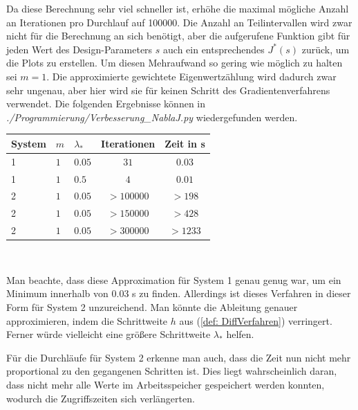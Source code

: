 \documentclass[a4paper,12pt]{report}
\newcommand{\1}{\mathds{1}}
\theoremstyle{plain} %
\theoremstyle{definition} %
\theoremstyle{remark}
\begin{document}
            Da diese Berechnung sehr viel schneller ist, erhöhe die maximal mögliche Anzahl an Iterationen pro Durchlauf auf 100000.
            Die Anzahl an Teilintervallen wird zwar nicht für die Berechnung an sich benötigt, aber die aufgerufene Funktion gibt für jeden Wert des Design-Parameters $s$
            auch ein entsprechendes $J^*(s)$ zurück, um die Plots zu erstellen.
            Um diesen Mehraufwand so gering wie möglich zu halten sei $m=1$. Die approximierte gewichtete Eigenwertzählung wird dadurch zwar sehr ungenau,
            aber hier wird sie für keinen Schritt des Gradientenverfahrens verwendet.
            Die folgenden Ergebnisse können in \textit{./Programmierung/Verbesserung\_NablaJ.py} wiedergefunden werden.

            \begin{table}[!ht]
                  \centering
                  \begin{tabular}{lllcc}
                       System & $m$ & $\lambda_*$ & Iterationen & Zeit in s\\
                       \hline
                       1 & $1$ & $0.05$ & $31$ & $0.03$ \\ 
                       \hline
                       1 & $1$ & $0.5$ & $4$ & $0.01$ \\
                       \hline
                       2 & $1$ & $0.05$ & $>100000$ & $>198$ \\
                       2 & $1$ & $0.05$ & $>150000$ & $>428$ \\
                       2 & $1$ & $0.05$ & $>300000$ & $>1233$ \\
                       \hline
                  \end{tabular}\\
                  \label{tab: Ergebnisse_nablaJ}
            \end{table}

            Man beachte, dass diese Approximation für System 1 genau genug war, um ein Minimum innerhalb von 0.03 s zu finden.
            Allerdings ist dieses Verfahren in dieser Form für System 2 unzureichend. Man könnte die Ableitung genauer approximieren,
            indem die Schrittweite $h$ aus (\ref{def: DiffVerfahren}) verringert.
            Ferner würde vielleicht eine größere Schrittweite $\lambda_*$ helfen.

            Für die Durchläufe für System 2 erkenne man auch, dass die Zeit nun nicht mehr proportional zu den gegangenen Schritten ist.
            Dies liegt wahrscheinlich daran, dass nicht mehr alle Werte im Arbeitsspeicher gespeichert werden konnten, wodurch die Zugriffszeiten sich verlängerten.
\end{document}
